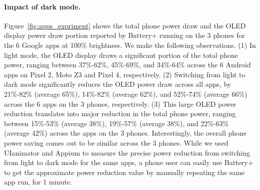 \paragraph{Impact of dark mode.}
Figure~\ref{fig:apps_expriment} shows the total phone power draw and
the OLED display power draw portion reported by Battery+
running on the 3 phones for the 6 Google apps at 100\% brightness.
We make the following observations.
%
(1) In light mode,
the OLED display draws a significant portion of the total phone power,
ranging between 
37\%-62\%, 45\%-69\%, and 34\%-64\% %
across the 6 Android apps on Pixel 2, Moto Z3 and Pixel 4, respectively.
%
%
(2) Switching from light to dark mode significantly
reduces the OLED power draw across all apps, by
21\%-82\% (average 65\%), 14\%-82\% (average 62\%), and 52\%-74\%  (average 66\%)
across the 6 apps on the 3 phones, respectively. 
(3) This large OLED power reduction translates into
major reduction in the total phone power,
ranging between 15\%-53\% (average 38\%), 19\%-57\% (average 38\%), and 22\%-63\%  (average 42\%)
across the apps on the 3 phones.
Interestingly,
the overall phone power saving comes out to
be similar across the 3 phones.
%
While we used UIanimator and Appium to measure the precise
power reduction from switching from light to dark mode for the same apps,
a phone user can easily use Battery+ to get the approximate power reduction value
by manually repeating the same app run, \eg for 1 minute.


